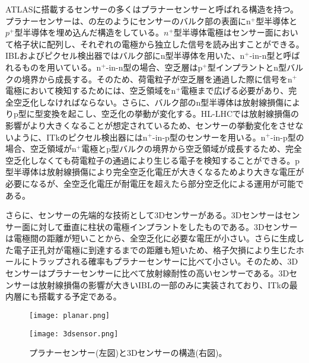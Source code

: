 ATLASに搭載するセンサーの多くはプラナーセンサーと呼ばれる構造を持つ。プラナーセンサーは、の左のようにセンサーのバルク部の表面にn$^+$型半導体と$p^+$型半導体を埋め込んだ構造をしている。$n^+$型半導体電極はセンサー面において格子状に配列し、それぞれの電極から独立した信号を読み出すことができる。IBLおよびピクセル検出器ではバルク部にn型半導体を用いた、n$^{+}$-in-n型と呼ばれるものを用いている。n$^{+}$-in-n型の場合、空乏層はp$^{+}$型インプラントとn型バルクの境界から成長する。そのため、荷電粒子が空乏層を通過した際に信号をn$^{+}$電極において検知するためには、空乏領域をn$^{+}$電極まで広げる必要があり、完全空乏化しなければならない。さらに、バルク部のn型半導体は放射線損傷によりp型に型変換を起こし、空乏化の挙動が変化する。HL-LHCでは放射線損傷の影響がより大きくなることが想定されているため、センサーの挙動変化をさせないように、ITkのピクセル検出器にはn$^{+}$-in-p型のセンサーを用いる。n$^{+}$-in-p型の場合、空乏領域がn$^{+}$電極とp型バルクの境界から空乏領域が成長するため、完全空乏化しなくても荷電粒子の通過により生じる電子を検知することができる。p型半導体は放射線損傷により完全空乏化電圧が大きくなるためより大きな電圧が必要になるが、全空乏化電圧が耐電圧を超えたら部分空乏化による運用が可能である。


さらに、センサーの先端的な技術として3Dセンサーがある。3Dセンサーはセンサー面に対して垂直に柱状の電極インプラントをしたものである。3Dセンサーは電極間の距離が短いことから、全空乏化に必要な電圧が小さい。さらに生成した電子正孔対が電極に到達するまでの距離も短いため、格子欠損により生じたホールにトラップされる確率もプラナーセンサーに比べて小さい。そのため、3Dセンサーはプラナーセンサーに比べて放射線耐性の高いセンサーである。3Dセンサーは放射線損傷の影響が大きいIBLの一部のみに実装されており、ITkの最内層にも搭載する予定である。

\begin{figure}[tbp]
  \begin{minipage}[b]{0.45\linewidth}
    \centering
    \texttt{[image: planar.png]}
  \end{minipage}
  \begin{minipage}[b]{0.45\linewidth}
    \centering
    \texttt{[image: 3dsensor.png]}
  \end{minipage}
  \caption[プラナーセンサーと3Dセンサーの構造]{プラナーセンサー(左図)と3Dセンサーの構造(右図)。}
  \label{fig:3dplanar}
\end{figure}



